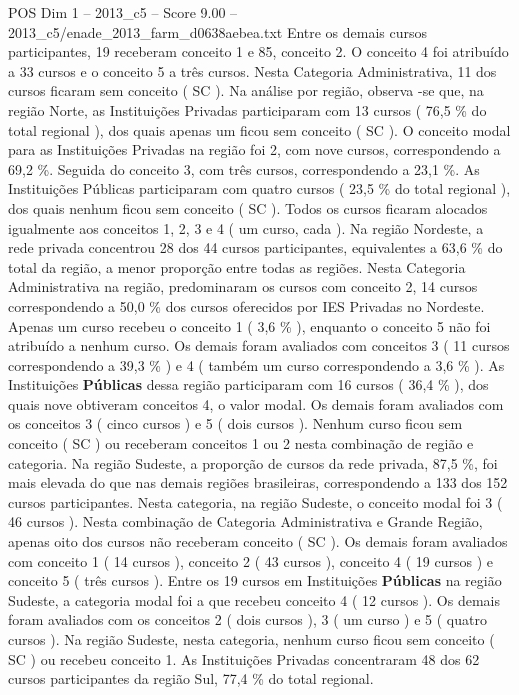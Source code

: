 \begin{textsample}{POS Dim 1 – 2013\_c5 – Score 9.00 – 2013\_c5/enade\_2013\_farm\_d0638aebea.txt}
Entre os demais cursos participantes, 19 receberam conceito 1 e 85, conceito 2.
O conceito 4 foi atribuído a 33 cursos e o conceito 5 a três cursos.
Nesta Categoria Administrativa, 11 dos cursos ficaram sem conceito ( SC ).
Na análise por região, observa -se que, na região Norte, as Instituições Privadas participaram com 13 cursos ( 76,5 \% do total regional ), dos quais apenas um ficou sem conceito ( SC ).
O conceito modal para as Instituições Privadas na região foi 2, com nove cursos, correspondendo a 69,2 \%.
Seguida do conceito 3, com três cursos, correspondendo a 23,1 \%.
As Instituições Públicas participaram com quatro cursos ( 23,5 \% do total regional ), dos quais nenhum ficou sem conceito ( SC ).
Todos os cursos ficaram alocados igualmente aos conceitos 1, 2, 3 e 4 ( um curso, cada ).
Na região Nordeste, a rede privada concentrou 28 dos 44 cursos participantes, equivalentes a 63,6 \% do total da região, a menor proporção entre todas as regiões.
Nesta Categoria Administrativa na região, predominaram os cursos com conceito 2, 14 cursos correspondendo a 50,0 \% dos cursos oferecidos por IES Privadas no Nordeste.
Apenas um curso recebeu o conceito 1 ( 3,6 \% ), enquanto o conceito 5 não foi atribuído a nenhum curso.
Os demais foram avaliados com conceitos 3 ( 11 cursos correspondendo a 39,3 \% ) e 4 ( também um curso correspondendo a 3,6 \% ).
As Instituições \textbf{Públicas} dessa região participaram com 16 cursos ( 36,4 \% ), dos quais nove obtiveram conceitos 4, o valor modal.
Os demais foram avaliados com os conceitos 3 ( cinco cursos ) e 5 ( dois cursos ).
Nenhum curso ficou sem conceito ( SC ) ou receberam conceitos 1 ou 2 nesta combinação de região e categoria.
Na região Sudeste, a proporção de cursos da rede privada, 87,5 \%, foi mais elevada do que nas demais regiões brasileiras, correspondendo a 133 dos 152 cursos participantes.
Nesta categoria, na região Sudeste, o conceito modal foi 3 ( 46 cursos ).
Nesta combinação de Categoria Administrativa e Grande Região, apenas oito dos cursos não receberam conceito ( SC ).
Os demais foram avaliados com conceito 1 ( 14 cursos ), conceito 2 ( 43 cursos ), conceito 4 ( 19 cursos ) e conceito 5 ( três cursos ).
Entre os 19 cursos em Instituições \textbf{Públicas} na região Sudeste, a categoria modal foi a que recebeu conceito 4 ( 12 cursos ).
Os demais foram avaliados com os conceitos 2 ( dois cursos ), 3 ( um curso ) e 5 ( quatro cursos ).
Na região Sudeste, nesta categoria, nenhum curso ficou sem conceito ( SC ) ou recebeu conceito 1.
As Instituições Privadas concentraram 48 dos 62 cursos participantes da região Sul, 77,4 \% do total regional.

\end{textsample}
